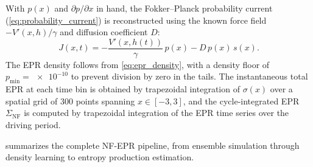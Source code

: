 With $p(x)$ and $\partial p/\partial x$ in hand, the Fokker--Planck probability current (\cref{eq:probability_current}) is reconstructed using the known force field $-V'(x,h)/\gamma$ and diffusion coefficient $D$:
\begin{equation}
    J(x,t) = -\frac{V'(x,h(t))}{\gamma}\,p(x) - D\,p(x)\,s(x).
    \label{eq:J_from_nf}
\end{equation}
The EPR density follows from \cref{eq:epr_density}, with a density floor of $p_{\min} = \num{e-10}$ to prevent division by zero in the tails.
The instantaneous total EPR at each time bin is obtained by trapezoidal integration of $\sigma(x)$ over a spatial grid of \num{300} points spanning $x \in [-3, 3]$, and the cycle-integrated EPR $\Sigma_{\mathrm{NF}}$ is computed by trapezoidal integration of the EPR time series over the driving period.

 summarizes the complete NF-EPR pipeline, from ensemble simulation through density learning to entropy production estimation.

